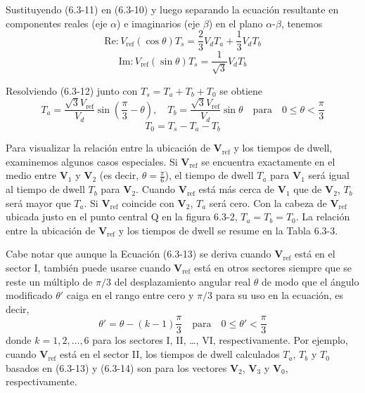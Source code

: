 \documentclass[letterpaper,12pt]{article}
\begin{document}
Sustituyendo (6.3-11) en (6.3-10) y luego separando la ecuación resultante en componentes reales (eje $\alpha$) e imaginarios (eje $\beta$) en el plano $\alpha$-$\beta$, tenemos
\[
\text{Re}: V_{\text{ref}}(\cos \theta) T_s = \frac{2}{3} V_d T_a + \frac{1}{3} V_d T_b \tag{6.3-12}
\]
\[
\text{Im}: V_{\text{ref}}(\sin \theta) T_s = \frac{1}{\sqrt{3}} V_d T_b
\]
    
Resolviendo (6.3-12) junto con \( T_s = T_a + T_b + T_0 \) se obtiene
\[
T_a = \frac{\sqrt{3} V_{\text{ref}}}{V_d} \sin\left(\frac{\pi}{3} - \theta\right), \quad T_b = \frac{\sqrt{3} V_{\text{ref}}}{V_d} \sin \theta \quad \text{para} \quad 0 \leq \theta < \frac{\pi}{3} \tag{6.3-13}
\]
\[
T_0 = T_s - T_a - T_b
\]
    
Para visualizar la relación entre la ubicación de \( \mathbf{V}_{\text{ref}} \) y los tiempos de dwell, examinemos algunos casos especiales. Si \( \mathbf{V}_{\text{ref}} \) se encuentra exactamente en el medio entre \( \mathbf{V}_1 \) y \( \mathbf{V}_2 \) (es decir, \(\theta = \frac{\pi}{6}\)), el tiempo de dwell \( T_a \) para \( \mathbf{V}_1 \) será igual al tiempo de dwell \( T_b \) para \( \mathbf{V}_2 \). Cuando \( \mathbf{V}_{\text{ref}} \) está más cerca de \( \mathbf{V}_1 \) que de \( \mathbf{V}_2 \), \( T_b \) será mayor que \( T_a \). Si \( \mathbf{V}_{\text{ref}} \) coincide con \( \mathbf{V}_2 \), \( T_a \) será cero. Con la cabeza de \( \mathbf{V}_{\text{ref}} \) ubicada justo en el punto central Q en la figura 6.3-2, \( T_a = T_b = T_0 \). La relación entre la ubicación de \( \mathbf{V}_{\text{ref}} \) y los tiempos de dwell se resume en la Tabla 6.3-3.
    
Cabe notar que aunque la Ecuación (6.3-13) se deriva cuando \( \mathbf{V}_{\text{ref}} \) está en el sector I, también puede usarse cuando \( \mathbf{V}_{\text{ref}} \) está en otros sectores siempre que se reste un múltiplo de \( \pi/3 \) del desplazamiento angular real \(\theta\) de modo que el ángulo modificado \(\theta'\) caiga en el rango entre cero y \( \pi/3 \) para su uso en la ecuación, es decir,
\[
\theta' = \theta - (k-1)\frac{\pi}{3} \quad \text{para} \quad 0 \leq \theta' < \frac{\pi}{3} \tag{6.3-14}
\]
donde \( k = 1, 2, \ldots, 6 \) para los sectores I, II, \ldots, VI, respectivamente. Por ejemplo, cuando \( \mathbf{V}_{\text{ref}} \) está en el sector II, los tiempos de dwell calculados \( T_a \), \( T_b \) y \( T_0 \) basados en (6.3-13) y (6.3-14) son para los vectores \( \mathbf{V}_2 \), \( \mathbf{V}_3 \) y \( \mathbf{V}_0 \), respectivamente.
\end{document}
